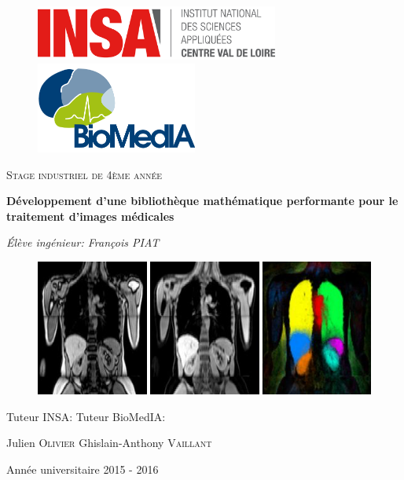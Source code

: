 \documentclass[10pt]{report}
\begin{document}
\begin{titlepage}	
	\flushleft
	\begin{figure}[!h]
		\includegraphics[height=1.8cm]{Reports/figures/logo_insa_cvl.png}
		\hfill
		\includegraphics[height=3cm]{Reports/figures/logo_biomedia.png}
	\end{figure}
	\centering
	\vspace{2cm}
	{\scshape\Large Stage industriel de 4ème année\par}
	\vspace{1.5cm}
	{\huge\bfseries Développement d'une bibliothèque mathématique performante pour le traitement d'images médicales\par}
	\vspace{2cm}
	{\Large\itshape Élève ingénieur: François PIAT\par}
		\vspace{1cm}
	\begin{figure}[!h]
		\begin{center}
			\includegraphics[width=13cm]{Reports/figures/biomedia_image.png}
		\end{center}
	\end{figure}
	\vfill
	\flushleft
	Tuteur INSA: \hfill Tuteur BioMedIA: \par
	Julien \textsc{Olivier} \hfill Ghislain-Anthony \textsc{Vaillant}
	\vfill
	\centering
	{\large Année universitaire 2015 - 2016 \par}
\end{titlepage}
\end{document}
